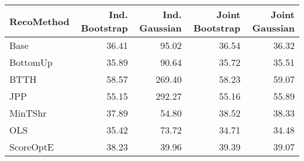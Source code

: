 
\begin{tabular}{l|r|r|r|r}
\hline
RecoMethod & Ind. Bootstrap & Ind. Gaussian & Joint Bootstrap & Joint Gaussian\\
\hline
Base & 36.41 & 95.02 & 36.54 & 36.32\\
\hline
BottomUp & 35.89 & 90.64 & 35.72 & 35.51\\
\hline
BTTH & 58.57 & 269.40 & 58.23 & 59.07\\
\hline
JPP & 55.15 & 292.27 & 55.16 & 55.89\\
\hline
MinTShr & 37.89 & 54.80 & 38.52 & 38.33\\
\hline
OLS & 35.42 & 73.72 & 34.71 & 34.48\\
\hline
ScoreOptE & 38.23 & 39.96 & 39.39 & 39.07\\
\hline
\end{tabular}
